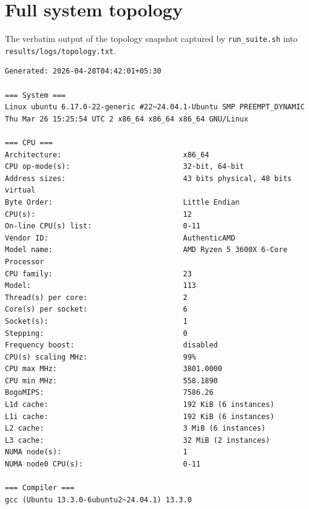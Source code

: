 \documentclass[a4paper,11pt]{article}
\begin{document}
\appendix

\section{Full system topology}
\label{app:topology}

The verbatim output of the topology snapshot captured by
\texttt{run\_suite.sh} into \texttt{results/logs/topology.txt}.

\begin{footnotesize}
\begin{verbatim}
Generated: 2026-04-28T04:42:01+05:30

=== System ===
Linux ubuntu 6.17.0-22-generic #22~24.04.1-Ubuntu SMP PREEMPT_DYNAMIC
Thu Mar 26 15:25:54 UTC 2 x86_64 x86_64 x86_64 GNU/Linux

=== CPU ===
Architecture:                            x86_64
CPU op-mode(s):                          32-bit, 64-bit
Address sizes:                           43 bits physical, 48 bits virtual
Byte Order:                              Little Endian
CPU(s):                                  12
On-line CPU(s) list:                     0-11
Vendor ID:                               AuthenticAMD
Model name:                              AMD Ryzen 5 3600X 6-Core Processor
CPU family:                              23
Model:                                   113
Thread(s) per core:                      2
Core(s) per socket:                      6
Socket(s):                               1
Stepping:                                0
Frequency boost:                         disabled
CPU(s) scaling MHz:                      99%
CPU max MHz:                             3801.0000
CPU min MHz:                             558.1890
BogoMIPS:                                7586.26
L1d cache:                               192 KiB (6 instances)
L1i cache:                               192 KiB (6 instances)
L2 cache:                                3 MiB (6 instances)
L3 cache:                                32 MiB (2 instances)
NUMA node(s):                            1
NUMA node0 CPU(s):                       0-11

=== Compiler ===
gcc (Ubuntu 13.3.0-6ubuntu2~24.04.1) 13.3.0


\end{verbatim}
\end{footnotesize}
\end{document}
